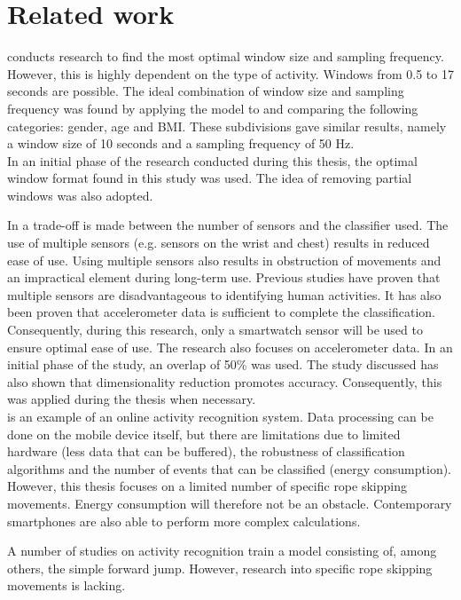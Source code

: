 \documentclass[twocolumn]{phdsymp} %
\begin{document}
\section{Related work}

\Cite{ref13} conducts research to find the most optimal window size and sampling frequency. However, this is highly dependent on the type of activity. Windows from 0.5 to 17 seconds are possible. 
The ideal combination of window size and sampling frequency was found by applying the model to and comparing the following categories: gender, age and BMI. These subdivisions gave similar results, namely a window size of 10 seconds and a sampling frequency of 50 Hz.\\
In an initial phase of the research conducted during this thesis, the optimal window format found in this study was used. The idea of removing partial windows was also adopted. 

In \cite{ref15} a trade-off is made between the number of sensors and the classifier used. The use of multiple sensors (e.g. sensors on the wrist and chest) results in reduced ease of use. Using multiple sensors also results in obstruction of movements and an impractical element during long-term use. Previous studies have proven that multiple sensors are disadvantageous to identifying human activities. It has also been proven that accelerometer data is sufficient to complete the classification. \\
Consequently, during this research, only a smartwatch sensor will be used to ensure optimal ease of use. The research also focuses on accelerometer data. In an initial phase of the study, an overlap of 50\% was used. The study discussed has also shown that dimensionality reduction promotes accuracy. Consequently, this was applied during the thesis when necessary. \\

\cite{ref17} is an example of an online activity recognition system.
Data processing can be done on the mobile device itself, but there are limitations due to limited hardware (less data that can be buffered), the robustness of classification algorithms and the number of events that can be classified (energy consumption). However, this thesis focuses on a limited number of specific rope skipping movements. Energy consumption will therefore not be an obstacle. Contemporary smartphones are also able to perform more complex calculations.

A number of studies on activity recognition train a model consisting of, among others, the simple forward jump. However, research into specific rope skipping movements is lacking.
\end{document}
